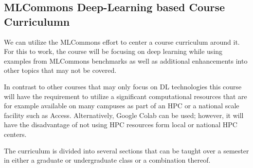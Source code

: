\documentclass[utf8]{FrontiersinVancouver} %
\begin{document}
\subsection{MLCommons Deep-Learning based Course Curriculumn}

We can utilize the MLCommons effort to center a course curriculum
around it. For this to work, the course will be focusing on deep
learning while using examples from MLCommons benchmarks as well as
additional enhancements into other topics that may not be covered.

In contrast to other courses that may only focus on DL technologies
this course will have the requirement to utilize a significant
computational resources that are for example available on many
campuses as part of an HPC or a national scale facility such as
Access. Alternatively, Google Colab can be used; however, it will have
the disadvantage of not using HPC resources form local or national HPC
centers.

The curriculum is divided into several sections that can be taught
over a semester in either a graduate or undergraduate class or a
combination thereof.
\end{document}
